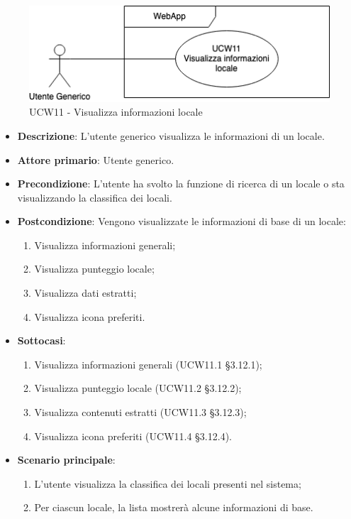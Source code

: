 \begin{figure}[!h]
\centering
\includegraphics[scale=0.5]{UC_images/UCW11.png} 
\caption{UCW11 - Visualizza informazioni locale}
\end{figure}
\begin{itemize}
    \item \textbf{Descrizione}: L'utente generico visualizza le informazioni di un locale.
    \item \textbf{Attore primario}: Utente generico.
    \item \textbf{Precondizione}: L'utente ha svolto la funzione di ricerca di un locale o sta visualizzando la classifica dei locali.
    \item \textbf{Postcondizione}: Vengono visualizzate le informazioni di base di un locale:
    \begin{enumerate}
        \item Visualizza informazioni generali;
        \item Visualizza punteggio locale;
        \item Visualizza dati estratti;
        \item Visualizza icona preferiti.
    \end{enumerate}   
	\item \textbf{Sottocasi}:    
	\begin{enumerate}  
		\item Visualizza informazioni generali (UCW11.1 \S{}3.12.1);
		\item Visualizza punteggio locale (UCW11.2 \S{}3.12.2);
		\item Visualizza contenuti estratti (UCW11.3 \S{}3.12.3);
		\item Visualizza icona preferiti (UCW11.4 \S{}3.12.4).
	\end{enumerate}
    \item \textbf{Scenario principale}: 
    \begin{enumerate}
	\item L'utente visualizza la classifica dei locali presenti nel sistema;
    \item Per ciascun locale, la lista mostrerà alcune informazioni di base.
    \end{enumerate}
\end{itemize}

